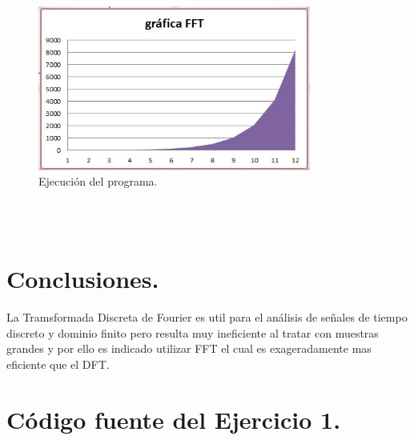 \documentclass[12pt,letterpaper]{article}
\begin{document}
\begin{figure}[ht!]
  \centering
  \includegraphics[width=0.8\textwidth]{imgFFT}
  \caption{Ejecución del programa.}
  \label{fig:FFT_1d}
\end{figure}


\\

\\

\section{Conclusiones.}
La Tramsformada Discreta de Fourier es util para el an\'alisis de señales de tiempo discreto y dominio finito pero resulta muy ineficiente al tratar con muestras grandes y por ello es indicado utilizar FFT el cual es exageradamente mas eficiente que el DFT.

\appendix
\section{Código fuente del Ejercicio 1.} 
\label{code:pendiente}
\end{document}
